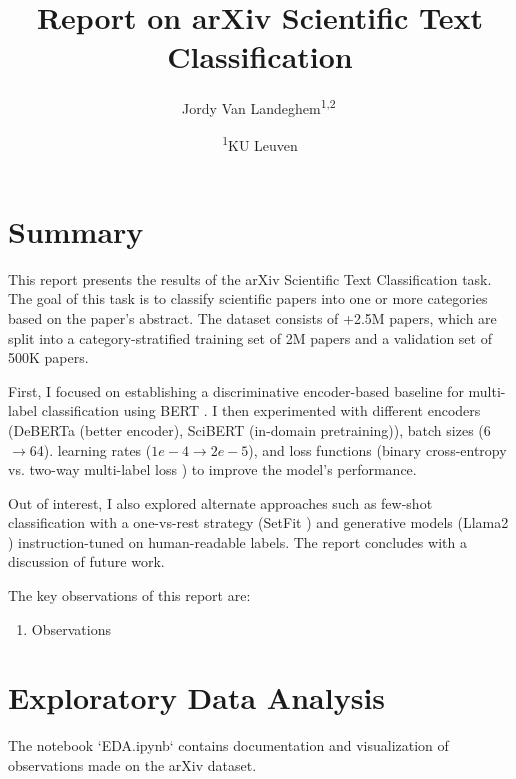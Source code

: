\documentclass[10pt,letterpaper]{article}
\begin{document}
\title{Report on arXiv Scientific Text Classification} %

\newcommand{\superaffil}[2]{\textsuperscript{#1}\,#2}

\author{
  \small Jordy Van Landeghem\superaffil{1,2}
  \and
  \footnotesize{
    \textsuperscript{1}KU Leuven
  }
}

\maketitle

\section{Summary}

This report presents the results of the arXiv Scientific Text Classification task. The goal of this task is to classify scientific papers into one or more categories based on the paper's abstract. The dataset consists of +2.5M papers, which are split into a category-stratified training set of 2M papers and a validation set of 500K papers.

First, I focused on establishing a discriminative encoder-based baseline for multi-label classification using BERT \cite{devlin2018bert}.
I then experimented with different encoders (DeBERTa \cite{he2020deberta} (better encoder), SciBERT \cite{maheshwari2021scibert} (in-domain pretraining)), batch sizes (6$\to$64). learning rates ($1e-4\to2e-5$), and loss functions (binary cross-entropy vs. two-way multi-label loss \cite{kobayashi2023two}) to improve the model's performance.

Out of interest, I also explored alternate approaches such as few-shot classification with a one-vs-rest strategy (SetFit \cite{tunstall2022efficient}) and generative models (Llama2 \cite{touvron2023llama}) instruction-tuned on human-readable labels. The report concludes with a discussion of future work.

\noindent The key observations of this report are:
\begin{enumerate}
  [label=\Roman*.,leftmargin=2\parindent]
  \item  Observations
\end{enumerate}

\section{Exploratory Data Analysis}

The notebook `EDA.ipynb` contains documentation and visualization of observations made on the arXiv dataset.
\end{document}
